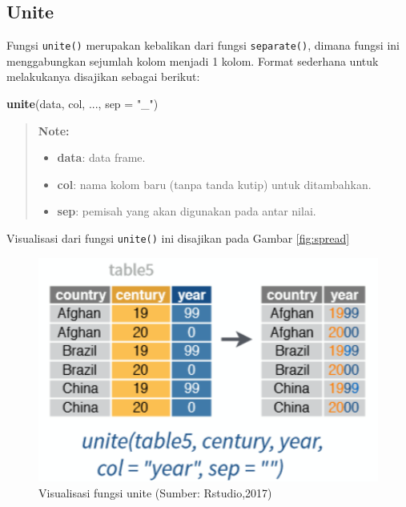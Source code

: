 \documentclass[]{book}
\newenvironment{Shaded}{\begin{snugshade}}{\end{snugshade}}
\newcommand{\KeywordTok}[1]{\textcolor[rgb]{0.13,0.29,0.53}{\textbf{#1}}}
\newcommand{\DataTypeTok}[1]{\textcolor[rgb]{0.13,0.29,0.53}{#1}}
\newcommand{\StringTok}[1]{\textcolor[rgb]{0.31,0.60,0.02}{#1}}
\newcommand{\NormalTok}[1]{#1}
\providecommand{\tightlist}{%
  \setlength{\itemsep}{0pt}\setlength{\parskip}{0pt}}
\begin{document}
\subsection{Unite}\label{unite}

Fungsi \texttt{unite()} merupakan kebalikan dari fungsi
\texttt{separate()}, dimana fungsi ini menggabungkan sejumlah kolom
menjadi 1 kolom. Format sederhana untuk melakukanya disajikan sebagai
berikut:

\begin{Shaded}
\begin{Highlighting}[]
\KeywordTok{unite}\NormalTok{(data, col, ..., }\DataTypeTok{sep =} \StringTok{"_"}\NormalTok{)}
\end{Highlighting}
\end{Shaded}

\begin{quote}
\textbf{Note: }

\begin{itemize}
\tightlist
\item
  \textbf{data}: data frame.
\item
  \textbf{col}: nama kolom baru (tanpa tanda kutip) untuk ditambahkan.
\item
  \textbf{sep}: pemisah yang akan digunakan pada antar nilai.
\end{itemize}
\end{quote}

Visualisasi dari fungsi \texttt{unite()} ini disajikan pada Gambar
\ref{fig:spread}

\begin{figure}

{\centering \includegraphics[width=5.39in]{unite} 

}

\caption{Visualisasi fungsi unite (Sumber: Rstudio,2017)}\label{fig:unite}
\end{figure}
\end{document}
